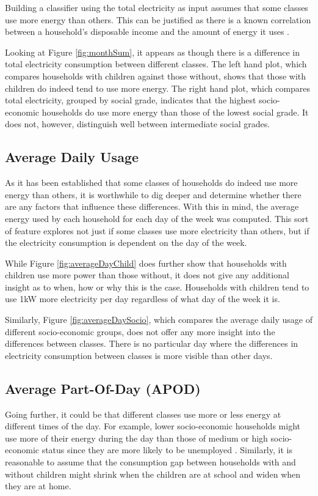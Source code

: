 Building a classifier using the total electricity as input assumes that some classes use more energy than others. This can be justified as there is a known correlation between a household's disposable income and the amount of energy it uses \cite{Gomez}.

\monthSum

Looking at Figure \ref{fig:monthSum}, it appears as though there is a difference in total electricity consumption between different classes. The left hand plot, which compares households with children against those without, shows that those with children do indeed tend to use more energy. The right hand plot, which compares total electricity, grouped by social grade, indicates that the highest socio-economic households do use more energy than those of the lowest social grade. It does not, however, distinguish well between intermediate social grades.

\subsection*{Average Daily Usage}
As it has been established that some classes of households do indeed use more energy than others, it is worthwhile to dig deeper and determine whether there are any factors that influence these differences. With this in mind, the average energy used by each household for each day of the week was computed. This sort of feature explores not just if some classes use more electricity than others, but if the electricity consumption is dependent on the day of the week. 

\averageDayChild
\averageDaySocio

While Figure \ref{fig:averageDayChild} does further show that households with children use more power than those without, it does not give any additional insight as to when, how or why this is the case. Households with children tend to use 1kW more electricity per day regardless of what day of the week it is.

Similarly, Figure \ref{fig:averageDaySocio}, which compares the average daily usage of different socio-economic groups, does not offer any more insight into the differences between classes. There is no particular day where the differences in electricity consumption between classes is more visible than other days.

\subsection*{Average Part-Of-Day (APOD)}
Going further, it could be that different classes use more or less energy at different times of the day. For example, lower socio-economic households might use more of their energy during the day than those of medium or high socio-economic status since they are more likely to be unemployed \cite{Bartley}. Similarly, it is reasonable to assume that the consumption gap between households with and without children might shrink when the children are at school and widen when they are at home.

